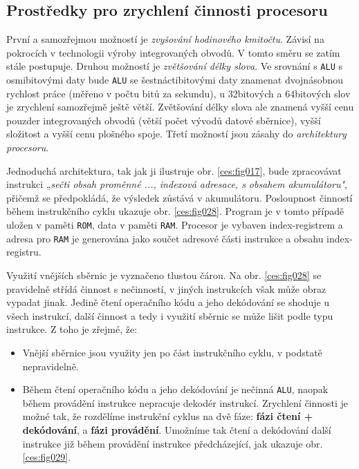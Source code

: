     \subsection{Prostředky pro zrychlení činnosti procesoru}\label{ces:IchapIVsecIIssecIII}
      První a samozřejmou možností je \emph{zvyšování hodinového kmitočtu}. Závisí na pokrocích v 
      technologii výroby integrovaných obvodů. V tomto směru se zatím stále postupuje. Druhou 
      možností je \emph{zvětšování délky slova}. Ve srovnání s \texttt{ALU} s osmibitovými daty 
      bude \texttt{ALU} se šestnáctibitovými daty znamenat dvojnásobnou rychlost práce (měřeno v 
      počtu bitů za sekundu), u 32bitových a 64bitových slov je zrychlení samozřejmě ještě větší. 
      Zvětšování délky slova ale znamená vyšší cenu pouzder integrovaných obvodů (větší počet 
      vývodů datové sběrnice), vyšší složitost a vyšší cenu plošného spoje. Třetí možností jsou 
      zásahy do \emph{architektury procesoru}.
      
      Jednoduchá architektura, tak jak ji ilustruje obr. \ref{ces:fig017}, bude zpracovávat 
      instrukci \emph{„sečti obsah proměnné ..., indexová adresace, s obsahem akumulátoru"}, 
      přičemž se předpokládá, že výsledek zůstává v akumulátoru. Posloupnost činností během 
      instrukčního cyklu ukazuje obr. \ref{ces:fig028}. Program je v tomto případě uložen v 
      paměti \texttt{ROM}, data v paměti \texttt{RAM}. Procesor je vybaven index-registrem a adresa 
      pro \texttt{RAM} je generována jako součet adresové části instrukce a obsahu index-registru.
        
      
      Využití vnějších sběrnic je vyznačeno tlustou čárou. Na obr. \ref{ces:fig028} se pravidelně
      střídá činnost s nečinností, v jiných instrukcích však může obraz vypadat jinak. Jedině čtení
      operačního kódu a jeho dekódování se shoduje u všech instrukcí, další činnost a tedy i využití
      sběrnic se může lišit podle typu instrukce. Z toho je zřejmé, že:
      \begin{itemize}[noitemsep]
        \item Vnější sběrnice jsou využity jen po část instrukčního cyklu, v podstatě nepravidelně.
        \item Během čtení operačního kódu a jeho dekódování je nečinná \texttt{ALU}, naopak během  
              provádění  instrukce nepracuje dekodér instrukcí. Zrychlení činnosti je možné tak, že 
              rozdělíme instrukční cyklus na dvě fáze: \textbf{fázi čtení + dekódování}, a 
              \textbf{fázi provádění}. Umožníme tak čtení a dekódování další instrukce již během 
              provádění instrukce předcházející, jak ukazuje obr. \ref{ces:fig029}.
      \end{itemize}        
       
